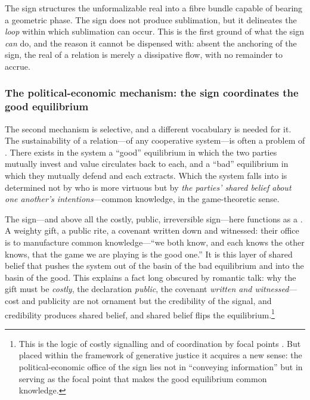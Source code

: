 \begin{claim}
The sign structures the unformalizable real into a fibre bundle capable of bearing a geometric phase. The sign does not produce sublimation, but it delineates the \emph{loop} within which sublimation can occur. This is the first ground of what the sign \emph{can} do, and the reason it cannot be dispensed with: absent the anchoring of the sign, the real of a relation is merely a dissipative flow, with no remainder to accrue.
\end{claim}

\subsubsection{The political-economic mechanism: the sign coordinates the good equilibrium}

The second mechanism is selective, and a different vocabulary is needed for it. The sustainability of a relation---of any cooperative system---is often a problem of . There exists in the system a ``good'' equilibrium in which the two parties mutually invest and value circulates back to each, and a ``bad'' equilibrium in which they mutually defend and each extracts. Which the system falls into is determined not by who is more virtuous but by \emph{the parties' shared belief about one another's intentions}---common knowledge, in the game-theoretic sense.

The sign---and above all the costly, public, irreversible sign---here functions as a . A weighty gift, a public rite, a covenant written down and witnessed: their office is to manufacture common knowledge---``we both know, and each knows the other knows, that the game we are playing is the good one.'' It is this layer of shared belief that pushes the system out of the basin of the bad equilibrium and into the basin of the good. This explains a fact long obscured by romantic talk: why the gift must be \emph{costly}, the declaration \emph{public}, the covenant \emph{written and witnessed}---cost and publicity are not ornament but the credibility of the signal, and credibility produces shared belief, and shared belief flips the equilibrium.\footnote{This is the logic of costly signalling \parencite{spence1973,zahavi1975} and of coordination by focal points \parencite{schelling1960}. But placed within the framework of generative justice it acquires a new sense: the political-economic office of the sign lies not in ``conveying information'' but in serving as the focal point that makes the good equilibrium common knowledge.}

